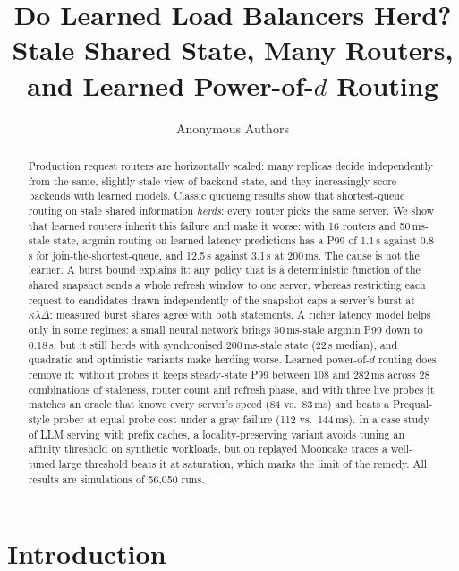 \documentclass[10pt,twocolumn,letterpaper]{article}
\newif\ifrealsys\realsysfalse %
\newcommand{\papertitle}{Do Learned Load Balancers Herd? Stale Shared State, Many Routers, and Learned Power-of-$d$ Routing}
\begin{document}
\title{\papertitle}
\author{Anonymous Authors}
\date{}
\maketitle

\begin{abstract}
Production request routers are horizontally scaled: many replicas decide independently from the same, slightly stale view of backend
state, and they increasingly score backends with learned models. Classic queueing results show that shortest-queue routing on stale shared
information \emph{herds}: every router picks the same server. We show that learned routers inherit this failure and make it worse:
with 16 routers and 50\,ms-stale state, argmin routing on learned latency predictions has a P99 of 1.1\,s against 0.8\,s for
join-the-shortest-queue, and 12.5\,s against 3.1\,s at 200\,ms. The cause is not the learner. A burst bound explains it: any policy that
is a deterministic function of the shared snapshot sends a whole refresh window to one server, whereas restricting each request to candidates drawn
independently of the snapshot caps a server's burst at $\kappa\lambda\Delta$; measured burst shares agree with both statements. A richer latency model helps only in some regimes: a small neural network brings
50\,ms-stale argmin P99 down to 0.18\,s, but it still herds with synchronised 200\,ms-stale state (22\,s median), and quadratic and optimistic variants make herding worse. Learned power-of-$d$ routing does remove it: without probes it
keeps steady-state P99 between 108 and 282\,ms across 28 combinations of staleness, router count and refresh phase, and with three live probes it
matches an oracle that knows every server's speed (84 vs.\ 83\,ms) and beats a Prequal-style prober at equal probe cost under a gray failure
(112 vs.\ 144\,ms). In a case study of LLM serving with prefix caches, a locality-preserving variant avoids tuning an affinity threshold on synthetic
workloads, but on replayed Mooncake traces a well-tuned large threshold beats it at saturation, which marks the limit of the remedy. All results are
simulations of 56{,}050 runs.\ifrealsys{} A multi-process prototype validates the simulator.\fi
\end{abstract}

\section{Introduction}
\end{document}
